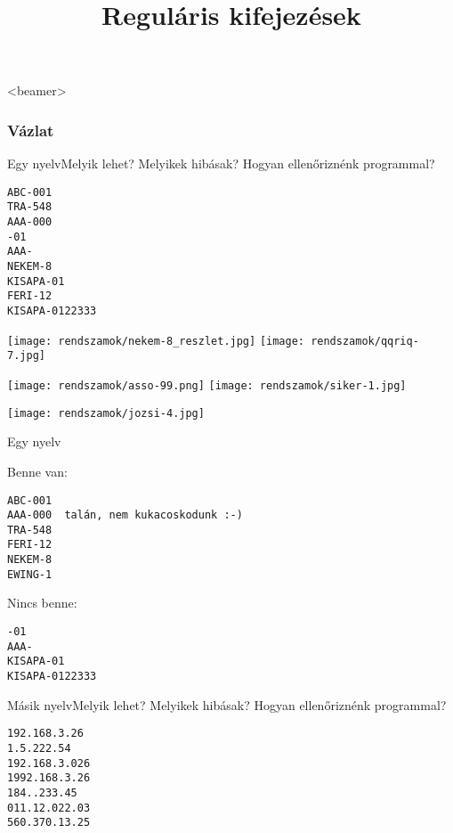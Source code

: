\documentclass[
    ignorenonframetext
    ]{beamer}
\title{Regul\'aris kifejez\'esek}
\subtitle{}
\begin{document}
\frame{\maketitle}

\begin{frame}<beamer>
  \frametitle{Vázlat}
  \tableofcontents
\end{frame}

\begin{frame}[fragile]
    {Egy nyelv}{Melyik lehet? Melyikek hibásak? Hogyan ellenőriznénk programmal?}

\begin{verbatim}
ABC-001
TRA-548
AAA-000
-01
AAA-
NEKEM-8
KISAPA-01
FERI-12
KISAPA-0122333
\end{verbatim}
\end{frame}

\begin{frame}
    \noindent
    \texttt{[image: rendszamok/nekem-8\_reszlet.jpg]} 
    \texttt{[image: rendszamok/qqriq-7.jpg]} 

    \noindent
    \texttt{[image: rendszamok/asso-99.png]} 
    \texttt{[image: rendszamok/siker-1.jpg]} 
\end{frame}

\begin{frame}
    \noindent
    \texttt{[image: rendszamok/jozsi-4.jpg]} 
\end{frame}

\begin{frame}[fragile]
    {Egy nyelv}

Benne van:
\begin{verbatim}
ABC-001
AAA-000  talán, nem kukacoskodunk :-)
TRA-548
FERI-12
NEKEM-8
EWING-1
\end{verbatim}

Nincs benne:
\begin{verbatim}
-01
AAA-
KISAPA-01
KISAPA-0122333
\end{verbatim}
\end{frame}

\begin{frame}[fragile]
    {Másik nyelv}{Melyik lehet? Melyikek hibásak? Hogyan ellenőriznénk programmal?}

\begin{verbatim}
192.168.3.26
1.5.222.54
192.168.3.026
1992.168.3.26
184..233.45
011.12.022.03
560.370.13.25
\end{verbatim}
\end{frame}
\end{document}
